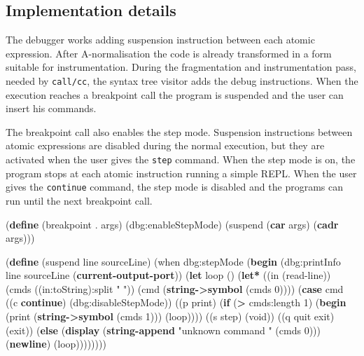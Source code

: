 \documentclass[12pt,a4paper,oneside,openright]{book}
\newenvironment{Shaded}{\begin{snugshade}}{\end{snugshade}}
\newcommand{\KeywordTok}[1]{\textcolor[rgb]{0.13,0.29,0.53}{\textbf{{#1}}}}
\newcommand{\DecValTok}[1]{\textcolor[rgb]{0.00,0.00,0.81}{{#1}}}
\newcommand{\StringTok}[1]{\textcolor[rgb]{0.31,0.60,0.02}{{#1}}}
\newcommand{\FunctionTok}[1]{\textcolor[rgb]{0.00,0.00,0.00}{{#1}}}
\newcommand{\NormalTok}[1]{{#1}}
\begin{document}
\subsection{Implementation details}\label{implementation-details}

The debugger works adding suspension instruction between each atomic
expression. After A-normalisation the code is already transformed in a
form suitable for instrumentation. During the fragmentation and
instrumentation pass, needed by \texttt{call/cc}, the syntax tree
visitor adds the debug instructions. When the execution reaches a
breakpoint call the program is suspended and the user can insert his
commands.

The breakpoint call also enables the step mode. Suspension instructions
between atomic expressions are disabled during the normal execution, but
they are activated when the user gives the \texttt{step} command. When
the step mode is on, the program stops at each atomic instruction
running a simple REPL. When the user gives the \texttt{continue}
command, the step mode is disabled and the programs can run until the
next breakpoint call.

\begin{Shaded}
\begin{Highlighting}[]
    \NormalTok{(}\KeywordTok{define}\FunctionTok{ }\NormalTok{(breakpoint . args)}
      \NormalTok{(dbg:enableStepMode)}
      \NormalTok{(suspend (}\KeywordTok{car} \NormalTok{args) (}\KeywordTok{cadr} \NormalTok{args)))}

    \NormalTok{(}\KeywordTok{define}\FunctionTok{ }\NormalTok{(suspend line sourceLine)}
      \NormalTok{(when dbg:stepMode}
        \NormalTok{(}\KeywordTok{begin}
          \NormalTok{(dbg:printInfo line sourceLine (}\KeywordTok{current-output-port}\NormalTok{))}
          \NormalTok{(}\KeywordTok{let} \NormalTok{loop ()}
            \NormalTok{(}\KeywordTok{let*} \NormalTok{((in (read-line))}
                   \NormalTok{(cmds ((in:toString):split }\StringTok{" "}\NormalTok{))}
                   \NormalTok{(cmd (}\KeywordTok{string->symbol} \NormalTok{(cmds }\DecValTok{0}\NormalTok{))))}
              \NormalTok{(}\KeywordTok{case} \NormalTok{cmd}
                \NormalTok{((c }\KeywordTok{continue}\NormalTok{) (dbg:disableStepMode))}
                \NormalTok{((p print)}
                 \NormalTok{(}\KeywordTok{if} \NormalTok{(}\KeywordTok{>} \NormalTok{cmds:length }\DecValTok{1}\NormalTok{)}
                   \NormalTok{(}\KeywordTok{begin}
                     \NormalTok{(print (}\KeywordTok{string->symbol} \NormalTok{(cmds }\DecValTok{1}\NormalTok{)))}
                     \NormalTok{(loop))))}
                \NormalTok{((s step) (void))}
                \NormalTok{((q quit exit) (exit))}
                \NormalTok{(}\KeywordTok{else} \NormalTok{(}\KeywordTok{display} \NormalTok{(}\KeywordTok{string-append}
                                   \StringTok{"unknown command "}
                                   \NormalTok{(cmds }\DecValTok{0}\NormalTok{)))}
                      \NormalTok{(}\KeywordTok{newline}\NormalTok{)}
                      \NormalTok{(loop))))))))}
\end{Highlighting}
\end{Shaded}
\end{document}
